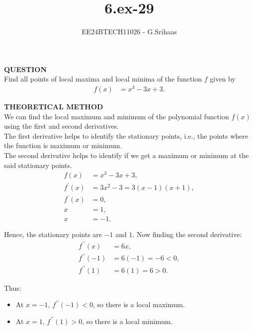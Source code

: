 \documentclass[journal]{IEEEtran}
\begin{document}

\vspace{3cm}

\title{6.ex-29}
\author{EE24BTECH11026 - G.Srihaas}
{\let\newpage\relax\maketitle}

\renewcommand{\thefigure}{\theenumi}
\renewcommand{\thetable}{\theenumi}
\setlength{\intextsep}{10pt} %

\renewcommand{\thetable}{\theenumi}

\textbf{QUESTION} \\
Find all points of local maxima and local minima of the function $f$ given by
\begin{align}
f(x) &= x^3 - 3x + 3.
\end{align}

\solution
\textbf{THEORETICAL METHOD} \\
We can find the local maximum and minimum of the polynomial function $f(x)$ using the first and second derivatives. \\
The first derivative helps to identify the stationary points, i.e., the points where the function is maximum or minimum. \\
The second derivative helps to identify if we get a maximum or minimum at the said stationary points. \\

\begin{align}
f(x) &= x^3 - 3x + 3, \\
f^{\prime}(x) &= 3x^2 - 3 = 3(x - 1)(x + 1), \\
f^{\prime}(x) &= 0, \\
x &= 1, \\
x &= -1.
\end{align}

Hence, the stationary points are $-1$ and $1$. Now finding the second derivative: \\
\begin{align}
f^{\prime\prime}(x) &= 6x, \\
f^{\prime\prime}(-1) &= 6(-1) = -6 < 0, \\
f^{\prime\prime}(1) &= 6(1) = 6 > 0.
\end{align}

Thus:
\begin{itemize}
    \item At $x = -1$, $f^{\prime\prime}(-1) < 0$, so there is a local maximum.
    \item At $x = 1$, $f^{\prime\prime}(1) > 0$, so there is a local minimum.
\end{itemize}
\end{document}
